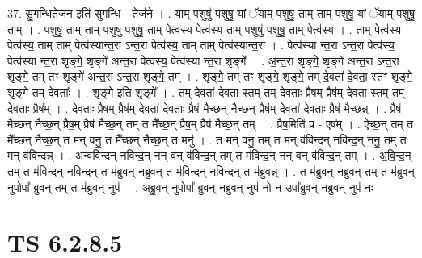 \documentclass[17pt]{extarticle}
\begin{document}
37. सु॒ग॒न्धि॒तेज॑न॒ इति॑ सुगन्धि - तेज॑ने । . याम् प॒शुषु॑ प॒शुषु॒ यां ॅयाम् प॒शुषु॒ ताम् ताम् प॒शुषु॒ यां ॅयाम् प॒शुषु॒ ताम् । . प॒शुषु॒ ताम् ताम् प॒शुषु॑ प॒शुषु॒ ताम् पेत्व॑स्य॒ पेत्व॑स्य॒ ताम् प॒शुषु॑ प॒शुषु॒ ताम् पेत्व॑स्य । . ताम् पेत्व॑स्य॒ पेत्व॑स्य॒ ताम् ताम् पेत्व॑स्यान्त॒रा ऽन्त॒रा पेत्व॑स्य॒ ताम् ताम् पेत्व॑स्यान्त॒रा । . पेत्व॑स्या न्त॒रा ऽन्त॒रा पेत्व॑स्य॒ पेत्व॑स्या न्त॒रा शृङ्गे॒ शृङ्गे॑ अन्त॒रा पेत्व॑स्य॒ पेत्व॑स्या न्त॒रा शृङ्गे᳚ । . अ॒न्त॒रा शृङ्गे॒ शृङ्गे॑ अन्त॒रा ऽन्त॒रा शृङ्गे॒ तम् तꣳ शृङ्गे॑ अन्त॒रा ऽन्त॒रा शृङ्गे॒ तम् । . शृङ्गे॒ तम् तꣳ शृङ्गे॒ शृङ्गे॒ तम् दे॒वता॑ दे॒वता॒ स्तꣳ शृङ्गे॒ शृङ्गे॒ तम् दे॒वताः᳚ । . शृङ्गे॒ इति॒ शृङ्गे᳚ । . तम् दे॒वता॑ दे॒वता॒ स्तम् तम् दे॒वताः॒ प्रैष॒म् प्रैष॑म् दे॒वता॒ स्तम् तम् दे॒वताः॒ प्रैष᳚म् । . दे॒वताः॒ प्रैष॒म् प्रैष॑म् दे॒वता॑ दे॒वताः॒ प्रैष॑ मैच्छन् नैच्छ॒न् प्रैष॑म् दे॒वता॑ दे॒वताः॒ प्रैष॑ मैच्छन्न् । . प्रैष॑ मैच्छन् नैच्छ॒न् प्रैष॒म् प्रैष॑ मैच्छ॒न् तम् त मै᳚च्छ॒न् प्रैष॒म् प्रैष॑ मैच्छ॒न् तम् । . प्रैष॒मिति॑ प्र - एष᳚म् । . ऐ॒च्छ॒न् तम् त मै᳚च्छन् नैच्छ॒न् त मन् वनु॒ त मै᳚च्छन् नैच्छ॒न् त मनु॑ । . त मन् वनु॒ तम् त मन् व॑विन्दन् नविन्द॒न् ननु॒ तम् त मन् व॑विन्दन्न् । . अन्व॑विन्दन् नविन्द॒न् नन् वन् व॑विन्द॒न् तम् त म॑विन्द॒न् नन् वन् व॑विन्द॒न् तम् । . अ॒वि॒न्द॒न् तम् त म॑विन्दन् नविन्द॒न् त म॑ब्रुवन् नब्रुव॒न् त म॑विन्दन् नविन्द॒न् त म॑ब्रुवन्न् । . त म॑ब्रुवन् नब्रुव॒न् तम् त म॑ब्रुव॒न् नुपोपा᳚ ब्रुव॒न् तम् त म॑ब्रुव॒न् नुप॑ । . अ॒ब्रु॒व॒न् नुपोपा᳚ ब्रुवन् नब्रुव॒न् नुप॑ नो न॒ उपा᳚ब्रुवन् नब्रुव॒न् नुप॑ नः । \newline
\pagebreak
{}

\section{ TS 6.2.8.5 }
\end{document}
